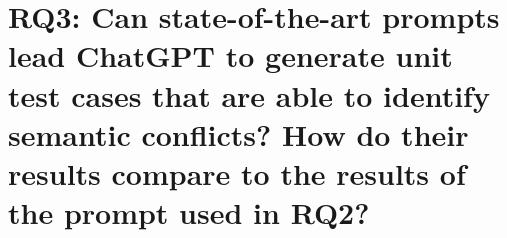 \section[Research Question 3: Existing prompts]{RQ3: Can state-of-the-art prompts lead ChatGPT to generate
unit test cases that are able to identify semantic conflicts?  How do their
results compare to the results of the prompt used in RQ2?}\label{sec:results:rq3}




